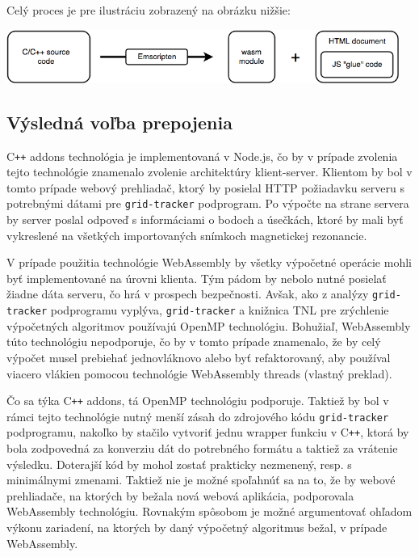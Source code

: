 Celý proces je pre ilustráciu zobrazený na obrázku nižšie:
\begin {center}
        \centering
        \includegraphics[height=1.75cm]{media/graphs/cpp_to_wasm.png}
        \captionsetup{justification=centering}
\end {center}

\subsection {Výsledná voľba prepojenia}
C\texttt{++} addons technológia je implementovaná v Node.js, čo by v prípade zvolenia tejto technológie znamenalo zvolenie architektúry klient-server. Klientom by bol v tomto prípade webový prehliadač, ktorý by posielal HTTP požiadavku serveru s potrebnými dátami pre \texttt{grid-tracker} podprogram. Po výpočte na strane servera by server poslal odpoveď s informáciami o bodoch a úsečkách, ktoré by mali byť vykreslené na všetkých importovaných snímkoch magnetickej rezonancie.

V prípade použitia technológie WebAssembly by všetky výpočetné operácie mohli byť implementované na úrovni klienta. Tým pádom by nebolo nutné posielať žiadne dáta serveru, čo hrá v prospech bezpečnosti. Avšak, ako z analýzy \texttt{grid-tracker} podprogramu vyplýva, \texttt{grid-tracker} a knižnica TNL pre zrýchlenie výpočetných algoritmov používajú OpenMP technológiu.
Bohužiaľ, WebAssembly túto technológiu nepodporuje, čo by v tomto prípade znamenalo, že by celý výpočet musel prebiehať jednovláknovo alebo byť refaktorovaný, aby používal viacero vlákien pomocou technológie WebAssembly threads \cite{webassembly_threads} (vlastný preklad).

Čo sa týka C\texttt{++} addons, tá OpenMP technológiu podporuje. Taktiež by bol v rámci tejto technológie nutný menší zásah do zdrojového kódu \newline \texttt{grid-tracker} podprogramu, nakoľko by stačilo vytvoriť jednu wrapper funkciu v C\texttt{++}, ktorá by bola zodpovedná za konverziu dát do potrebného formátu a taktiež za vrátenie výsledku. Doterajší kód by mohol zostať prakticky nezmenený, resp. s minimálnymi zmenami.
Taktiež nie je možné spoľahnúť sa na to, že by webové prehliadače, na ktorých by bežala nová webová aplikácia, podporovala WebAssembly technológiu. Rovnakým spôsobom je možné argumentovať ohľadom výkonu zariadení, na ktorých by daný výpočetný algoritmus bežal, v prípade WebAssembly.

